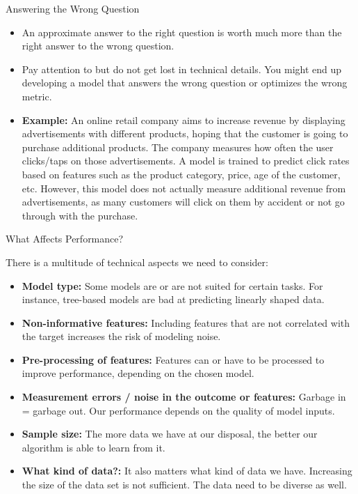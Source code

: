 \documentclass[11pt,compress,t,notes=noshow, aspectratio=169, xcolor=table]{beamer}
\begin{document}
\begin{frame}{Answering the Wrong Question}
\begin{itemize}
\setlength\itemsep{1em}
    \item An approximate answer to the right question is worth much more than the right answer to the wrong question.
    \item Pay attention to but do not get lost in technical details. You might end up developing a model that answers the wrong question or optimizes the wrong metric.
    \item \textbf{Example:} An online retail company aims to increase revenue by displaying advertisements with different products, hoping that the customer is going to purchase additional products. The company measures how often the user clicks/taps on those advertisements. A model is trained to predict click rates based on features such as the product category, price, age of the customer, etc. However, this model does not actually measure additional revenue from advertisements, as many customers will click on them by accident or not go through with the purchase.
\end{itemize}
    
\end{frame}
\begin{frame}{What Affects Performance?}

There is a multitude of technical aspects we need to consider:
\vspace{1em}
\begin{itemize}
\setlength\itemsep{1em}
    \item \textbf{Model type:} Some models are or are not suited for certain tasks. For instance, tree-based models are bad at predicting linearly shaped data.
    \item \textbf{Non-informative features:} Including features that are not correlated with the target increases the risk of modeling noise.
    \item \textbf{Pre-processing of features:} Features can or have to be processed to improve performance, depending on the chosen model.
    \item \textbf{Measurement errors / noise in the outcome or features:} Garbage in = garbage out. Our performance depends on the quality of model inputs.
    \item \textbf{Sample size:} The more data we have at our disposal, the better our algorithm is able to learn from it.
    \item \textbf{What kind of data?:} It also matters what kind of data we have. Increasing the size of the data set is not sufficient. The data need to be diverse as well.
\end{itemize}
\end{frame}
\end{document}
